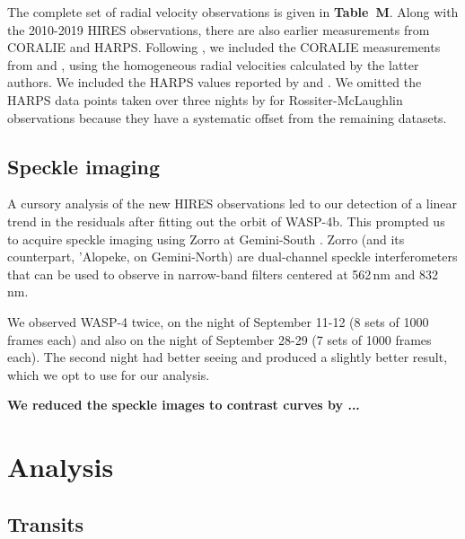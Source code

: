 \documentclass[12pt,twocolumn,tighten]{aastex62}
\begin{document}
The complete set of radial velocity observations is given in {\bf
Table~M}.  Along with the 2010-2019 HIRES observations, there are also
earlier measurements from CORALIE and HARPS.  Following
, we included the CORALIE measurements
from \citet{wilson_wasp-4b_2008} and \citet{triaud_spin-orbit_2010},
using the homogeneous radial velocities calculated by the latter
authors. We included the HARPS values reported by
\citet{pont_determining_2011} and \citet{husnoo_observational_2012}.
We omitted the HARPS data points taken over three nights by
\citet{triaud_spin-orbit_2010} for Rossiter-McLaughlin observations
because they have a systematic offset from the remaining datasets.

\subsection{Speckle imaging}

A cursory analysis of the new HIRES observations led to our detection
of a linear trend in the residuals after fitting out the orbit of
WASP-4b.  This prompted us to acquire speckle imaging using Zorro at
Gemini-South \citep[see][, and the instrument
web-pages\footnote{\url{www.gemini.edu/sciops/instruments/alopeke-zorro/}}]{scott_nessi_2018}.
Zorro (and its counterpart, 'Alopeke, on Gemini-North) are
dual-channel speckle interferometers that can be used to observe in
narrow-band filters centered at 562$\,$nm and 832$\,$nm.  

We observed WASP-4 twice, on the night of September 11-12 (8 sets of
1000 frames each) and also on the night of September 28-29 (7 sets of
1000 frames each). The second night had better seeing and produced a
slightly better result, which we opt to use for our analysis.

{\bf We reduced the speckle images to contrast curves by ...}


\section{Analysis}
\label{sec:analysis}

\subsection{Transits}
\label{sec:transit_analysis}
\end{document}
